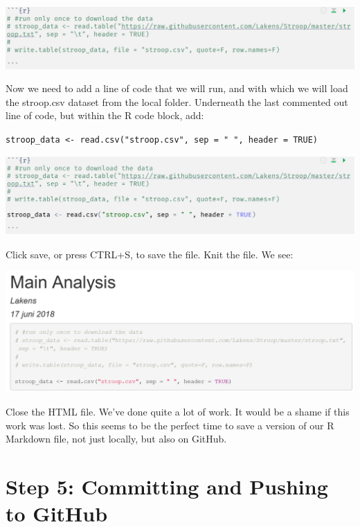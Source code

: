 \documentclass[
  oneside]{krantz}
\begin{document}
\begin{center}\includegraphics[width=1\linewidth]{images/0061d311bf4819c08afde5f9b110f9b6} \end{center}

Now we need to add a line of code that we will run, and with which we will load
the stroop.csv dataset from the local folder. Underneath the last commented out
line of code, but within the R code block, add:

\texttt{stroop\_data\ \textless{}-\ read.csv("stroop.csv",\ sep\ =\ "\ ",\ header\ =\ TRUE)}

\begin{center}\includegraphics[width=1\linewidth]{images/f14461f73699f865e4850e99990606f2} \end{center}

Click save, or press CTRL+S, to save the file. Knit the file. We see:

\begin{center}\includegraphics[width=1\linewidth]{images/f860eea02424968a1c0ca4afc5b583df} \end{center}

Close the HTML file. We've done quite a lot of work. It would be a shame if this
work was lost. So this seems to be the perfect time to save a version of our R
Markdown file, not just locally, but also on GitHub.

\hypertarget{step-5-committing-and-pushing-to-github}{%
\section{Step 5: Committing and Pushing to GitHub}\label{step-5-committing-and-pushing-to-github}}
\end{document}
